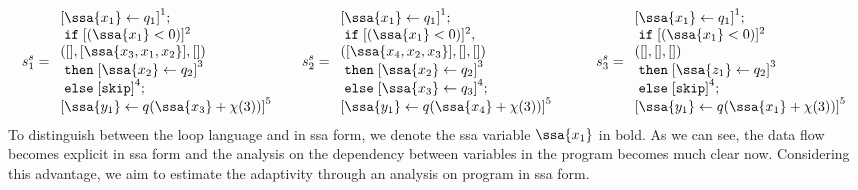 \[
 s_1^{s} = \begin{array}{l}
      \clabel{ \assign{{\ssa{x_1}}}{q_1}}^{1} ; \\
      \eif  [({\ssa{x_1} }< 0 )]^{2}\\
      ([], [{ \ssa{x_3, x_1,x_2} }], []) \\
      \ethen \clabel{\assign{{\ssa{x_2}}}{q_2}}^{3}\\
      \eelse \clabel{\eskip}^{4} ; \\
      \clabel{\assign{{\ssa{y_1}}}{q({\ssa{x_3} + \chi(3)})}}^{5}
 \end{array}
 ~~~~~
  s_2^{s} = \begin{array}{l}
      \clabel{ \assign{{\ssa{x_1}}}{q_1}}^{1} ; \\
      \eif  [({\ssa{x_1}} < 0 )]^{2}, \\
      ( [{\ssa{x_4, x_2,x_3}}], [], [] ) \\
      \ethen \clabel{\assign{{\ssa{x_2}}}{q_2}}^{3}\\
      \eelse \clabel{\assign{{\ssa{x_3}}}{q_3}}^{4} ; \\
      \clabel{\assign{{\ssa{y_1}}}{q({\ssa{x_4}}+\chi(3))}}^{5}
 \end{array}
 ~~~~~~~~
  s_3^{s} = \begin{array}{l}
      \clabel{ \assign{{\ssa{x_1}}}{q_1}}^{1} ; \\
      \eif  [({\ssa{x_1}} < 0 )]^{2} \\
       ( [], [], [] ) \\
      \ethen \clabel{\assign{{\ssa{z_1}}}{q_2}}^{3}\\
      \eelse \clabel{\eskip}^{4} ; \\
      \clabel{\assign{{\ssa{y_1}}}{q({\ssa{x_1}}+\chi(3))}}^{5}
 \end{array}
\]
To distinguish between the loop language and in ssa form, we denote the ssa variable ${\ssa{x_1}}$ in bold. As we can see, the data flow becomes explicit in ssa form and the analysis on the dependency between variables in the program becomes much clear now. Considering this advantage, we aim to estimate the adaptivity through an analysis on program in ssa form. 



